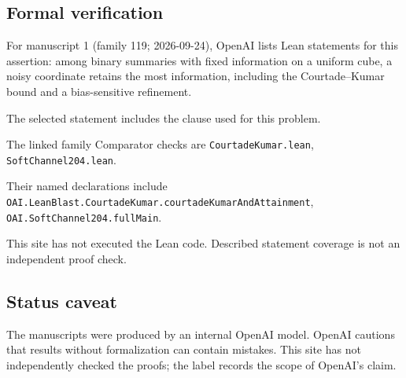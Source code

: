 \documentclass[11pt]{article}
\begin{document}
\subsection{Formal verification}
For manuscript 1 (family 119; 2026-09-24), OpenAI lists Lean statements for this assertion: among binary summaries with fixed information on a uniform cube, a noisy coordinate retains the most information, including the Courtade--Kumar bound and a bias-sensitive refinement.

The selected statement includes the clause used for this problem.

The linked family Comparator checks are \texttt{CourtadeKumar.lean}, \texttt{SoftChannel204.lean}.

Their named declarations include \texttt{OAI.LeanBlast.CourtadeKumar.courtadeKumarAndAttainment}, \texttt{OAI.SoftChannel204.fullMain}.

This site has not executed the Lean code. Described statement coverage is not an independent proof check.

\subsection{Status caveat}
The manuscripts were produced by an internal OpenAI model. OpenAI cautions that results without formalization can contain mistakes. This site has not independently checked the proofs; the label records the scope of OpenAI's claim.
\end{document}
